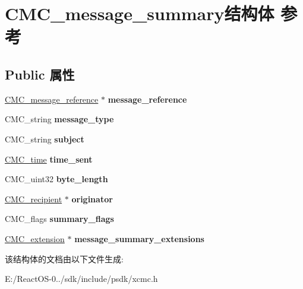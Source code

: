 \hypertarget{struct_c_m_c__message__summary}{}\section{C\+M\+C\+\_\+message\+\_\+summary结构体 参考}
\label{struct_c_m_c__message__summary}
\subsection*{Public 属性}
\begin{DoxyCompactItemize}
\item 
\mbox{\label{struct_c_m_c__message__summary_a3dd505325e0bbcb890f8bac6d2d3eb7b}} 
\hyperlink{struct_c_m_c__counted__string}{C\+M\+C\+\_\+message\+\_\+reference} $\ast$ {\bfseries message\+\_\+reference}
\item 
\mbox{\label{struct_c_m_c__message__summary_a1a876c5385dd65894e5c49c6ca352c07}} 
C\+M\+C\+\_\+string {\bfseries message\+\_\+type}
\item 
\mbox{\label{struct_c_m_c__message__summary_a28a09849dd569ac917c99aa947eb3709}} 
C\+M\+C\+\_\+string {\bfseries subject}
\item 
\mbox{\label{struct_c_m_c__message__summary_ab174a24ee39807b105432f47e1a1c827}} 
\hyperlink{struct_c_m_c__time}{C\+M\+C\+\_\+time} {\bfseries time\+\_\+sent}
\item 
\mbox{\label{struct_c_m_c__message__summary_ae4993c15d5bfcbada2f540a99dcae5c7}} 
C\+M\+C\+\_\+uint32 {\bfseries byte\+\_\+length}
\item 
\mbox{\label{struct_c_m_c__message__summary_ae7b01d8449c72e1097c9395a959b5e2b}} 
\hyperlink{struct_c_m_c__recipient}{C\+M\+C\+\_\+recipient} $\ast$ {\bfseries originator}
\item 
\mbox{\label{struct_c_m_c__message__summary_afc06d4015fc8157929b4c68c73e04a11}} 
C\+M\+C\+\_\+flags {\bfseries summary\+\_\+flags}
\item 
\mbox{\label{struct_c_m_c__message__summary_abb34bf67cb0c071bb0d0e9824da84c6b}} 
\hyperlink{struct_c_m_c__extension}{C\+M\+C\+\_\+extension} $\ast$ {\bfseries message\+\_\+summary\+\_\+extensions}
\end{DoxyCompactItemize}


该结构体的文档由以下文件生成\+:\begin{DoxyCompactItemize}
\item 
E\+:/\+React\+O\+S-\/0../sdk/include/psdk/xcmc.\+h\end{DoxyCompactItemize}
